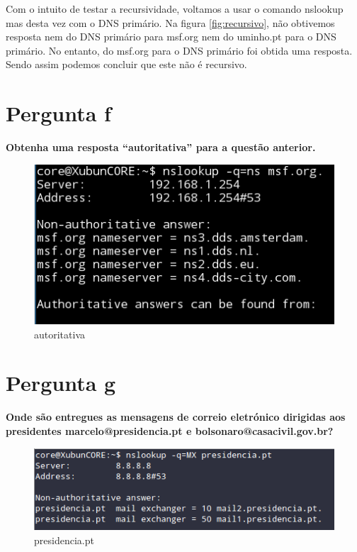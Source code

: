 \documentclass[a4paper]{report}
\begin{document}
Com o intuito de testar a recursividade, voltamos a usar o comando nslookup
mas desta vez com o DNS primário. Na figura \ref{fig:recursivo}, não obtivemos
resposta nem do DNS primário para msf.org nem do uminho.pt para o DNS primário.
No entanto, do msf.org para o DNS primário foi obtida uma resposta. Sendo assim
podemos concluir que este não é recursivo.

\section{Pergunta f}
\textbf{Obtenha uma resposta “autoritativa” para a questão anterior.}

\begin{figure}[H]
    \centering 
    \includegraphics[width=\textwidth]{images/autoritativa.png}  
    \caption{autoritativa}
    \label{fig:autoritativa}
\end{figure}

\section{Pergunta g}
\textbf{Onde são entregues as mensagens de correio eletrónico dirigidas aos
presidentes marcelo@presidencia.pt e bolsonaro@casacivil.gov.br?}

\begin{figure}[H]
    \centering 
    \includegraphics[width=\textwidth]{images/presidencia_pt.png}  
    \caption{presidencia.pt}
    \label{fig:presidencia.pt}
\end{figure}
\end{document}

